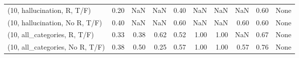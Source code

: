 \begin{table*}[h!]
\begin{adjustbox}{width=2\columnwidth,center}
\begin{tabular}{lrrr|rrr|rrr}
(10, hallucination, R, T/F)           &                      0.20 &                   NaN &                       NaN &                          0.40 &                       NaN &                           NaN &                                    NaN &                               0.60 &                                  None \\
(10, hallucination, No R, T/F)        &                      0.40 &                   NaN &                       NaN &                          0.60 &                       NaN &                           NaN &                                   0.60 &                               0.60 &                                  None \\
(10, all\_categories, R, T/F)          &                      0.33 &                  0.38 &                      0.62 &                          0.52 &                      1.00 &                          1.00 &                                    NaN &                               0.67 &                                  None \\
(10, all\_categories, No R, T/F)       &                      0.38 &                  0.50 &                      0.25 &                          0.57 &                      1.00 &                          1.00 &                                   0.57 &                               0.76 &                                  None \\




\end{tabular}
\end{adjustbox}
\end{table*}
